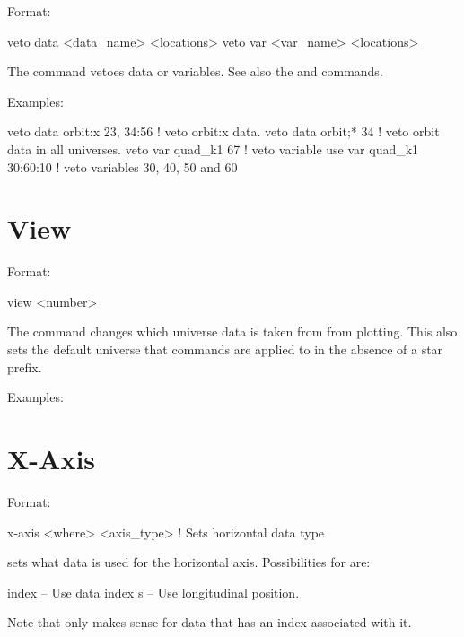 Format:
\begin{example}
  veto data <data_name> <locations>
  veto var <var_name> <locations>
\end{example}

\vskip 0.2in 
The  command vetoes data or variables. See also the
 and  commands.

Examples:
\begin{example}
  veto data orbit:x  23, 34:56 ! veto orbit:x data.
  veto data orbit;* 34         ! veto orbit data in all universes.
  veto var quad_k1 67          ! veto variable
  use var quad_k1 30:60:10     ! veto variables 30, 40, 50 and 60
\end{example}

\section{View}
\label{s:view}

Format:
\begin{example}
  view <number>
\end{example}

\vskip 0.2in 
The  command changes which universe data is taken from from
plotting.  This also sets the default universe that commands are
applied to in the absence of a star prefix.

Examples:

\section{X-Axis}
\label{s:x-axis}

Format:
\begin{example}
  x-axis <where> <axis_type> ! Sets horizontal data type
\end{example}

\vskip 0.2in 
 sets what data is used for the horizontal
axis. Possibilities for  are:
\begin{example}
  index    -- Use data index
  s        -- Use longitudinal position.
\end{example}
Note that  only makes sense for data that has an index
associated with it.

